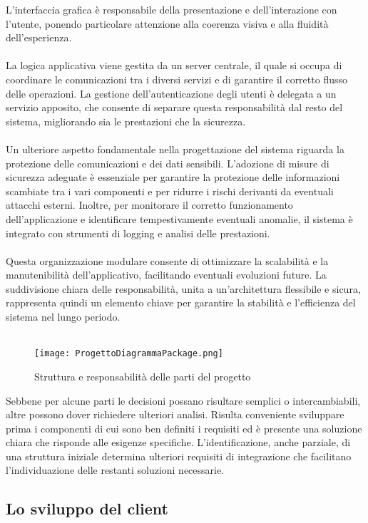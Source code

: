 L'interfaccia grafica è responsabile della presentazione e dell’interazione con l’utente, ponendo particolare attenzione alla coerenza visiva e alla fluidità dell’esperienza.\\
\\
La logica applicativa viene gestita da un server centrale, il quale si occupa di coordinare le comunicazioni tra i diversi servizi e di garantire il corretto flusso delle operazioni.
La gestione dell’autenticazione degli utenti è delegata a un servizio apposito,
che consente di separare questa responsabilità dal resto del sistema, migliorando sia le prestazioni che la sicurezza.\\
\\
Un ulteriore aspetto fondamentale nella progettazione del sistema riguarda la protezione delle comunicazioni e dei dati sensibili.
L’adozione di misure di sicurezza adeguate è essenziale per garantire la protezione delle informazioni scambiate tra i vari componenti e
per ridurre i rischi derivanti da eventuali attacchi esterni.
Inoltre, per monitorare il corretto funzionamento dell’applicazione e identificare tempestivamente eventuali anomalie,
il sistema è integrato con strumenti di logging e analisi delle prestazioni.\\
\\
Questa organizzazione modulare consente di ottimizzare la scalabilità e la manutenibilità dell’applicativo,
facilitando eventuali evoluzioni future.
La suddivisione chiara delle responsabilità, unita a un’architettura flessibile e sicura,
rappresenta quindi un elemento chiave per garantire la stabilità e l’efficienza del sistema nel lungo periodo.\\
\\

\begin{figure}[h!]
    \centering
    \texttt{[image: ProgettoDiagrammaPackage.png]}
    \caption{Struttura e responsabilità delle parti del progetto}
\end{figure}
Sebbene per alcune parti le decisioni possano risultare semplici o intercambiabili, altre possono dover richiedere ulteriori analisi. Risulta conveniente sviluppare prima i componenti di cui sono ben definiti i requisiti ed è presente una soluzione chiara che risponde alle esigenze specifiche. L’identificazione, anche parziale, di una struttura iniziale determina ulteriori requisiti di integrazione che facilitano l’individuazione delle restanti soluzioni necessarie.

\clearpage
\subsection{Lo sviluppo del client}

